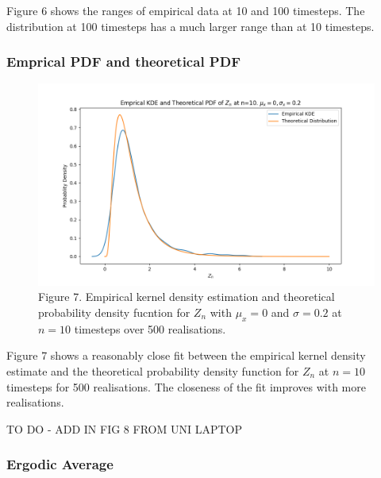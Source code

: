\documentclass{article}
\begin{document}
Figure 6 shows the ranges of empirical data at 10 and 100 timesteps. The distribution at 100 timesteps has a much larger range than at 10 timesteps.

\subsubsection{Emprical PDF and theoretical PDF}

\begin{figure}[H]
\includegraphics[scale=0.5]{empirical_pdf_kde_10_a.png} 
\small{Figure 7. Empirical kernel density estimation and theoretical probability density fucntion for $Z_n$ with $\mu_x=0$ and $\sigma=0.2$ at $n=10$ timesteps over 500 realisations.}
\end{figure}

Figure 7 shows a reasonably close fit between the empirical kernel density estimate and the theoretical probability density function for $Z_n$ at $n=10$ timesteps for 500 realisations. The closeness of the fit improves with more realisations.

TO DO - ADD IN FIG 8 FROM UNI LAPTOP


\subsubsection{Ergodic Average}
\end{document}
